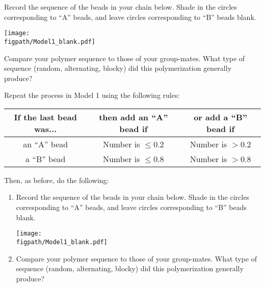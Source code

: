 \begin{activity}[Copolymerization]
\begin{model}
\end{model}


\begin{ctqs}

	\question Record the sequence of the beads in your chain below.  Shade in the circles corresponding to ``A'' beads, and leave circles corresponding to ``B'' beads blank.
	
		\vspace{6pt}
		\centerline{\texttt{[image: \\figpath/Model1\_blank.pdf]}}
	
	\question Compare your polymer sequence to those of your group-mates.  What type of sequence (random, alternating, blocky) did this polymerization generally produce?
		
		\begin{solution}[1.25in]
		\end{solution}
	
	\question Repeat the process in Model 1 using the following rules:	\begin{center}
					\renewcommand{\arraystretch}{1.5}
					\begin{tabular}{|c|c|c|}
						\hline
						\textbf{If the last bead was...} &  \textbf{then add an ``A'' bead if} & \textbf{or add a ``B'' bead if}\\\hline
						 an ``A'' bead & Number is $\leq 0.2$ & Number is $> 0.2$ \\
						 a ``B'' bead & Number is $\leq 0.8$ & Number is $> 0.8$ \\\hline
					\end{tabular}
					\end{center}
	
		Then, as before, do the following:
		\begin{enumerate}
			\item Record the sequence of the beads in your chain below.  Shade in the circles corresponding to ``A'' beads, and leave circles corresponding to ``B'' beads blank.
	
		\vspace{6pt}
		\centerline{\texttt{[image: \\figpath/Model1\_blank.pdf]}}
	
			\item Compare your polymer sequence to those of your group-mates.  What type of sequence (random, alternating, blocky) did this polymerization generally produce?
			
				\begin{solution}[1.25in]
				\end{solution}
				

\end{enumerate}
\end{ctqs}
\end{activity}
